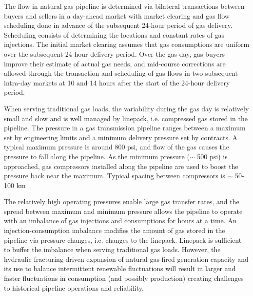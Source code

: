 \documentclass[10pt, conference, compsocconf]{IEEEtran}
\begin{document}
The flow in natural gas pipeline is determined via bilateral transactions between buyers and sellers in a day-ahead market with market clearing and gas flow scheduling done in advance of the subsequent 24-hour period of gas delivery.  Scheduling consists of determining the locations and constant rates of gas injections. The initial market clearing assumes that gas consumptions are uniform over the subsequent 24-hour delivery period. Over the gas day, gas buyers improve their estimate of actual gas needs, and mid-course corrections are allowed through the transaction and scheduling of gas flows in two subsequent intra-day markets at 10 and 14 hours after the start of the 24-hour delivery period.

When serving traditional gas loads, the variability during the gas day is relatively small and slow and is well managed by linepack, i.e. compressed gas stored in the pipeline. The pressure in a gas transmission pipeline ranges between a maximum set by engineering limits and a minimum delivery pressure set by contracts.  A typical maximum pressure is around 800 psi, and flow of the gas causes the pressure to fall along the pipeline. As the minimum pressure ($\sim$ 500 psi) is approached, gas compressors installed along the pipeline are used to boost the pressure back near the maximum. Typical spacing between compressors is $\sim$ 50-100 km

The relatively high operating pressures enable large gas transfer rates, and the spread between maximum and minimum pressure allows the pipeline to operate with an imbalance of gas injections and consumptions for hours at a time.  An injection-consumption imbalance modifies the amount of gas stored in the pipeline via pressure changes, i.e. changes to the linepack.  Linepack is sufficient to buffer the imbalance when serving traditional gas loads. However, the hydraulic fracturing-driven expansion of natural gas-fired generation capacity \cite{10CWB} and its use to balance intermittent renewable fluctuations will result in larger and faster fluctuations in consumption (and possibly production) creating challenges to historical pipeline operations and reliability.
\end{document}
